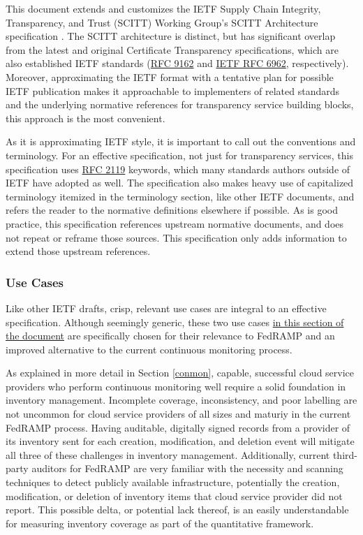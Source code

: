 \documentclass{jdf}
\begin{document}
This document extends and customizes the IETF Supply Chain Integrity, Transparency, and Trust (SCITT) Working Group's SCITT Architecture specification \citeyear{scitt25}. The SCITT architecture is distinct, but has significant overlap from the latest and original Certificate Transparency specifications, which are also established IETF standards (\href{https://datatracker.ietf.org/doc/html/rfc9162}{RFC 9162} and \href{https://datatracker.ietf.org/doc/html/rfc6962}{IETF RFC 6962}, respectively). Moreover, approximating the IETF format with a tentative plan for possible IETF publication makes it approachable to implementers of related standards and the underlying normative references for transparency service building blocks, this approach is the most convenient.

As it is approximating IETF style, it is important to call out the conventions and terminology. For an effective specification, not just for transparency services, this specification uses \href{https://datatracker.ietf.org/doc/html/rfc2119}{RFC 2119} keywords, which many standards authors outside of IETF have adopted as well. The specification also makes heavy use of capitalized terminology itemized in the terminology section, like other IETF documents, and refers the reader to the normative definitions elsewhere if possible. As is good practice, this specification references upstream normative documents, and does not repeat or reframe those sources. This specification only adds information to extend those upstream references.

\subsubsection{Use Cases}

Like other IETF drafts, crisp, relevant use cases are integral to an effective specification. Although seemingly generic, these two use cases \href{https://aj-stein.github.io/conmotion/architecture.html#use-cases}{in this section of the document} are specifically chosen for their relevance to FedRAMP and an improved alternative to the current continuous monitoring process.

As explained in more detail in Section \ref{conmon}, capable, successful cloud service providers who perform continuous monitoring well require a solid foundation in inventory management. Incomplete coverage, inconsistency, and poor labelling are not uncommon for cloud service providers of all sizes and maturiy in the current FedRAMP process. Having auditable, digitally signed records from a provider of its inventory sent for each creation, modification, and deletion event will mitigate all three of these challenges in inventory management. Additionally, current third-party auditors for FedRAMP are very familiar with the necessity and scanning techniques to detect publicly available infrastructure, potentially the creation, modification, or deletion of inventory items that cloud service provider did not report. This possible delta, or potential lack thereof, is an easily understandable for measuring inventory coverage as part of the quantitative framework.
\end{document}
